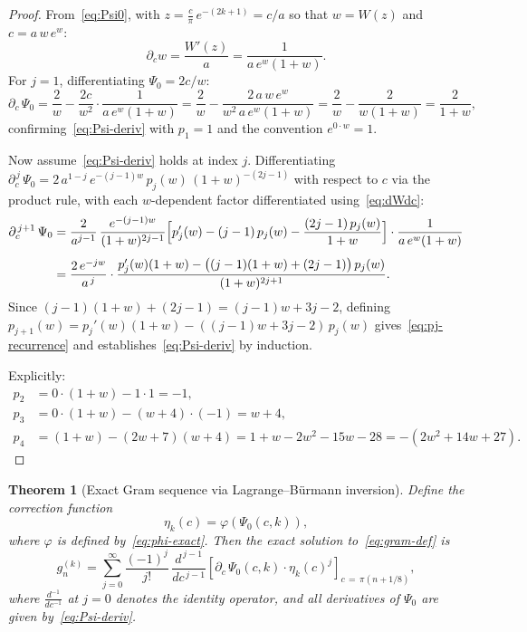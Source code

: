\documentclass[11pt]{article}
\newtheorem{theorem}{Theorem}[section]
\theoremstyle{definition}
\begin{document}
\begin{proof}
From~\eqref{eq:Psi0}, with $z = \frac{c}{\pi}\,e^{-(2k+1)} = c/a$
so that $w = W(z)$ and $c = a\,w\,e^w$:
\begin{equation}
  \partial_c w = \frac{W'(z)}{a} = \frac{1}{a\,e^w(1+w)}.
  \label{eq:dWdc}
\end{equation}
For $j=1$, differentiating $\Psi_0 = 2c/w$:
\begin{equation}
  \partial_c\,\Psi_0
    = \frac{2}{w} - \frac{2c}{w^2}\cdot\frac{1}{a\,e^w(1+w)}
    = \frac{2}{w} - \frac{2\,a\,w\,e^w}{w^2\,a\,e^w(1+w)}
    = \frac{2}{w} - \frac{2}{w(1+w)}
    = \frac{2}{1+w},
\end{equation}
confirming~\eqref{eq:Psi-deriv} with $p_1 = 1$ and the convention
$e^{0\cdot w} = 1$.

Now assume~\eqref{eq:Psi-deriv} holds at index $j$.
Differentiating
$\partial_c^{\,j}\,\Psi_0 = 2\,a^{1-j}\,e^{-(j-1)w}\,p_j(w)\,(1+w)^{-(2j-1)}$
with respect to $c$ via the product rule, with each $w$-dependent
factor differentiated using~\eqref{eq:dWdc}:
\begin{align}
  \partial_c^{\,j+1}\,\Psi_0
  &= \frac{2}{a^{j-1}}\,\frac{e^{-(j-1)w}}{(1+w)^{2j-1}}
     \Bigl[p_j'(w) - (j-1)\,p_j(w)
           - \frac{(2j-1)\,p_j(w)}{1+w}\Bigr]
     \cdot\frac{1}{a\,e^w(1+w)} \notag\\[4pt]
  &= \frac{2\,e^{-jw}}{a^{\,j}}\cdot
     \frac{p_j'(w)(1+w) - \bigl((j-1)(1+w) + (2j-1)\bigr)\,p_j(w)}
          {(1+w)^{2j+1}}.
  \label{eq:induction-step}
\end{align}
Since $(j-1)(1+w) + (2j-1) = (j-1)w + 3j - 2$, defining
$p_{j+1}(w) = p_j'(w)(1+w) - ((j-1)w + 3j-2)\,p_j(w)$
gives~\eqref{eq:pj-recurrence} and establishes~\eqref{eq:Psi-deriv}
by induction.

Explicitly:
\begin{align}
  p_2 &= 0\cdot(1+w) - 1\cdot 1 = -1, \\
  p_3 &= 0\cdot(1+w) - (w+4)\cdot(-1) = w+4, \\
  p_4 &= (1+w) - (2w+7)(w+4) = 1+w - 2w^2-15w-28 = -(2w^2+14w+27).
\end{align}
\end{proof}

\begin{theorem}[Exact Gram sequence via Lagrange--B\"urmann inversion]
\label{thm:lagrange}
Define the correction function
\begin{equation}
  \eta_k(c) = \varphi\!\left(\Psi_0(c,k)\right),
\end{equation}
where $\varphi$ is defined by~\eqref{eq:phi-exact}. Then the exact
solution to~\eqref{eq:gram-def} is
\begin{equation}
  g_n^{(k)} = \sum_{j=0}^{\infty} \frac{(-1)^j}{j!}\,
    \frac{d^{\,j-1}}{dc^{\,j-1}}\!\left[
      \partial_c\,\Psi_0(c,k)\cdot\eta_k(c)^j
    \right]_{c\,=\,\pi(n+1/8)},
  \label{eq:lagrange}
\end{equation}
where $\frac{d^{-1}}{dc^{-1}}$ at $j=0$ denotes the identity
operator, and all derivatives of $\Psi_0$ are given by~\eqref{eq:Psi-deriv}.
\end{theorem}
\end{document}
